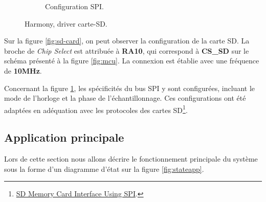 \begin{figure}[!h]
\begin{subfigure}[b]{0.44\textwidth}
		\caption{Configuration SPI.}
		\label{fig:sd-card-spi}
	\end{subfigure}
	\hfill
	\caption{Harmony, driver carte-SD.}
	\label{fig:HDriverSD}
\end{figure}

Sur la figure \ref{fig:sd-card}, on peut observer la configuration de la carte SD. La broche de \textit{Chip Select} est attribuée à \textbf{RA10}, qui correspond à \textbf{CS\_SD} sur le schéma présenté à la figure \ref{fig:mcu}. La connexion est établie avec une fréquence de \textbf{10MHz}.

Concernant la figure \ref{fig:sd-card-spi}, les spécificités du bus SPI y sont configurées, incluant le mode de l'horloge et la phase de l'échantillonnage. Ces configurations ont été adaptées en adéquation avec les protocoles des cartes SD\footnote{\href{https://www.renesas.com/us/en/document/apn/sd-memory-card-interface-using-spi}{SD Memory Card Interface Using SPI}.}.


\clearpage

\subsection{Application principale} 

Lors de cette section nous allons décrire le fonctionnement principale du système sous la forme d'un diagramme d'état sur la figure \ref{fig:stateapp}.

